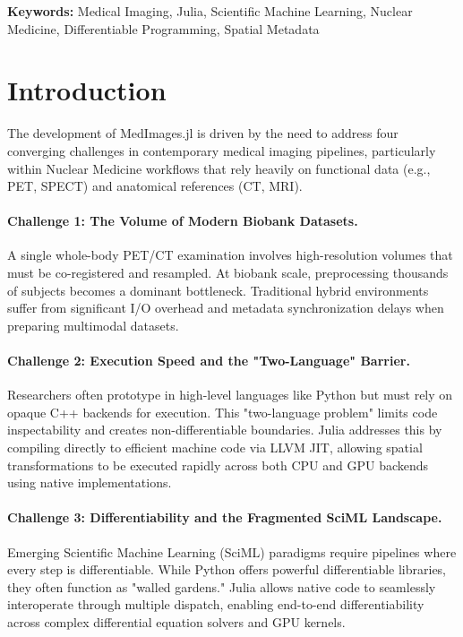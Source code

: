 \documentclass[10pt,letterpaper]{article}
\begin{document}
\textbf{Keywords:} Medical Imaging, Julia, Scientific Machine Learning, Nuclear Medicine, Differentiable Programming, Spatial Metadata

\section{Introduction}
The development of MedImages.jl is driven by the need to address four converging challenges in contemporary medical imaging pipelines, particularly within Nuclear Medicine workflows that rely heavily on functional data (e.g., PET, SPECT) and anatomical references (CT, MRI).

\paragraph{Challenge 1: The Volume of Modern Biobank Datasets.}
A single whole-body PET/CT examination involves high-resolution volumes that must be co-registered and resampled. At biobank scale, preprocessing thousands of subjects becomes a dominant bottleneck. Traditional hybrid environments suffer from significant I/O overhead and metadata synchronization delays when preparing multimodal datasets.

\paragraph{Challenge 2: Execution Speed and the "Two-Language" Barrier.}
Researchers often prototype in high-level languages like Python but must rely on opaque C++ backends for execution. This "two-language problem" limits code inspectability and creates non-differentiable boundaries. Julia addresses this by compiling directly to efficient machine code via LLVM JIT, allowing spatial transformations to be executed rapidly across both CPU and GPU backends using native implementations.

\paragraph{Challenge 3: Differentiability and the Fragmented SciML Landscape.}
Emerging Scientific Machine Learning (SciML) paradigms require pipelines where every step is differentiable. While Python offers powerful differentiable libraries, they often function as "walled gardens." Julia allows native code to seamlessly interoperate through multiple dispatch, enabling end-to-end differentiability across complex differential equation solvers and GPU kernels.
\end{document}
